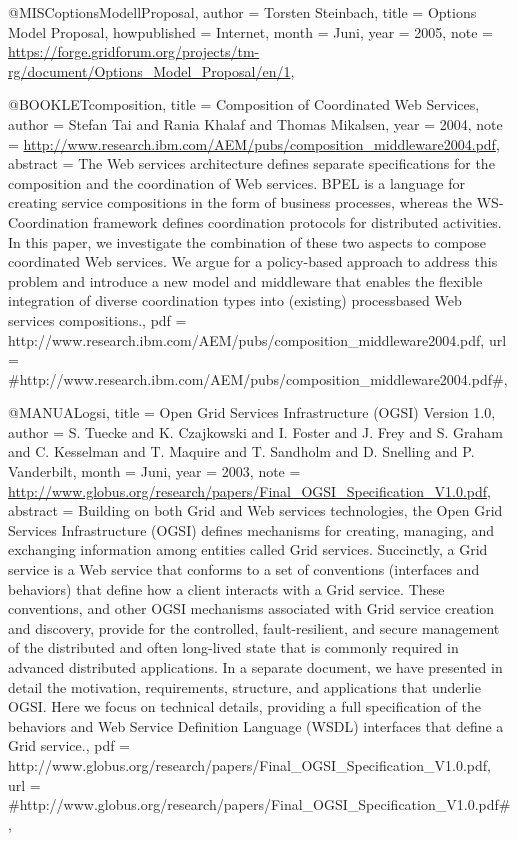 @MISC{optionsModellProposal,
  author = {Torsten Steinbach},
  title = {{Options Model Proposal}},
  howpublished = {Internet},
  month = {Juni},
  year = {2005},
  note = {\url{https://forge.gridforum.org/projects/tm-rg/document/Options_Model_Proposal/en/1}},
}

@BOOKLET{composition,
  title = {{Composition of Coordinated Web Services}},
  author = {Stefan Tai and Rania Khalaf and Thomas Mikalsen},
  year = {2004},
  note = {\url{http://www.research.ibm.com/AEM/pubs/composition_middleware2004.pdf}},
  abstract = {The Web services architecture defines separate specifications for
	the
composition and the coordination of Web services. BPEL is a language
	for
creating service compositions in the form of business processes,
	whereas
the WS-Coordination framework defines coordination protocols
	for
distributed activities. In this paper, we investigate the combination
	of
these two aspects to compose coordinated Web services. We argue
	for a
policy-based approach to address this problem and introduce
	a new
model and middleware that enables the flexible integration
	of diverse
coordination types into (existing) processbased Web services
	compositions.},
  pdf = {http://www.research.ibm.com/AEM/pubs/composition_middleware2004.pdf},
  url = {#http://www.research.ibm.com/AEM/pubs/composition_middleware2004.pdf#},
}

@MANUAL{ogsi,
  title = {{Open Grid Services Infrastructure (OGSI) Version 1.0}},
  author = {S. Tuecke and K. Czajkowski and I. Foster and J. Frey and S. Graham
	and C. Kesselman and T. Maquire and T. Sandholm and D. Snelling and
	P. Vanderbilt},
  month = {Juni},
  year = {2003},
  note = {\url{http://www.globus.org/research/papers/Final_OGSI_Specification_V1.0.pdf}},
  abstract = {Building on both Grid and Web services
technologies, the Open Grid
	Services Infrastructure (OGSI) defines mechanisms
for creating, managing,
	and exchanging information among entities
called Grid services. Succinctly,
	a Grid service is a Web service that
conforms to a set of conventions
	(interfaces and behaviors) that
define how a client interacts with
	a Grid service. These conventions,
and other OGSI mechanisms associated
	with Grid service creation and
discovery, provide for the controlled,
	fault-resilient, and secure
management of the distributed and often
	long-lived state that is
commonly required in advanced distributed
	applications. In a separate
document, we have presented in detail
	the motivation, requirements,
structure, and applications that underlie
	OGSI. Here we focus on technical
details, providing a full specification
	of the behaviors and Web Service
Definition Language (WSDL) interfaces
	that define a Grid service.},
  pdf = {http://www.globus.org/research/papers/Final_OGSI_Specification_V1.0.pdf},
  url = {#http://www.globus.org/research/papers/Final_OGSI_Specification_V1.0.pdf#},
}

